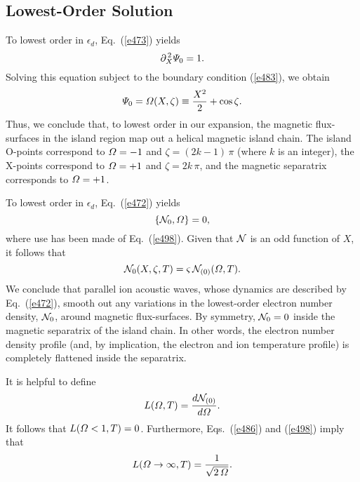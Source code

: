 \documentclass[12pt,prb,aps]{revtex4-1}
\begin{document}
\subsection{Lowest-Order Solution}
To lowest order in $\epsilon_d$, Eq.~(\ref{e473}) yields
\begin{equation}
\partial_X^{\,2}{\mit\Psi}_0 = 1.
\end{equation} 
Solving this equation subject to the boundary condition (\ref{e483}), we obtain
\begin{equation}\label{e498}
{\mit\Psi}_0 = {\mit\Omega}(X,\zeta)\equiv \frac{X^2}{2} + \cos\zeta.
\end{equation}
Thus, we conclude that, to lowest order in our expansion, the magnetic flux-surfaces in the island region map out a helical magnetic island
chain. The island O-points correspond to ${\mit\Omega}=-1$ and $\zeta=(2k-1)\,\pi$ (where $k$ is an integer), the
X-points correspond to ${\mit\Omega}=+1$ and $\zeta = 2k\,\pi$, and the magnetic separatrix corresponds to 
${\mit\Omega}=+1$. 

To lowest order in $\epsilon_d$, Eq.~(\ref{e472}) yields
\begin{equation}
\{{\cal N}_0, {\mit\Omega}\}= 0,
\end{equation}
where use has been made of Eq.~(\ref{e498}). Given that ${\cal N}$ is an odd function of $X$, it
follows that
\begin{equation}\label{e500}
{\cal N}_0(X,\zeta,T) =\varsigma\, {\cal N}_{(0)}({\mit\Omega},T).
\end{equation}
We conclude that parallel
ion acoustic waves, whose dynamics are described by Eq.~(\ref{e472}),  smooth  out
any variations in the lowest-order electron number density, ${\cal N}_0$,  around magnetic flux-surfaces. 
By symmetry, ${\cal N}_{0}=0$ inside the magnetic separatrix of the island chain. In other words, the electron number
density profile (and, by implication, the electron and ion temperature profile) is completely flattened inside 
the  separatrix. 

It is helpful to define
\begin{equation}\label{e501}
L({\mit\Omega},T) = \frac{d{\cal N}_{(0)}}{d{\mit\Omega}}.
\end{equation}
It follows that $L({\mit\Omega}<1,T)=0$. Furthermore, Eqs.~(\ref{e486}) and (\ref{e498}) imply that
\begin{equation}\label{e502}
L({\mit\Omega}\rightarrow\infty,T) = \frac{1}{\sqrt{2\,{\mit\Omega}}}.
\end{equation}
\end{document}
